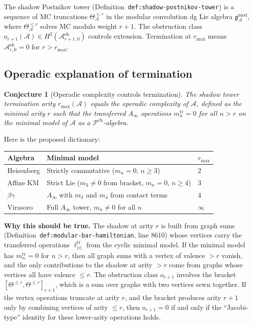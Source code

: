 \documentclass[11pt]{article}
\newtheorem{conjecture}{Conjecture}
\theoremstyle{definition}
\theoremstyle{remark}
\newcommand{\Pch}{\mathcal{P}^{\mathrm{ch}}}
\newcommand{\cA}{\mathcal{A}}
\begin{document}
The shadow Postnikov tower
(Definition~\texttt{def:shadow-postnikov-tower}) is a sequence of
MC truncations $\Theta_\cA^{\leq r}$ in the modular convolution
dg Lie algebra $\mathfrak{g}_\cA^{\mathrm{mod}}$, where
$\Theta_\cA^{\leq r}$ solves MC modulo weight $r+1$.  The
obstruction class $o_{r+1}(\cA) \in H^2(\cA^{\mathrm{sh}}_{r+1,0})$
controls extension.  Termination at $r_{\max}$ means
$\cA^{\mathrm{sh}}_{r,0} = 0$ for $r > r_{\max}$.

\subsection{Operadic explanation of termination}

\begin{conjecture}[Operadic complexity controls termination]
\label{conj:operadic-termination}
The shadow tower termination arity $r_{\max}(\cA)$ equals the
\emph{operadic complexity} of $\cA$, defined as the minimal arity
$r$ such that the transferred $A_\infty$ operations
$m_n^{\mathrm{tr}} = 0$ for all $n > r$ on the minimal model of
$\cA$ as a $\Pch$-algebra.
\end{conjecture}

Here is the proposed dictionary:

\begin{center}
\begin{tabular}{lll}
\hline
\textbf{Algebra} & \textbf{Minimal model} & $r_{\max}$ \\
\hline
Heisenberg & Strictly commutative ($m_n = 0$, $n \geq 3$) & $2$ \\
Affine KM & Strict Lie ($m_3 \neq 0$ from bracket, $m_n = 0$,
$n \geq 4$) & $3$ \\
$\beta\gamma$ & $A_\infty$ with $m_3$ and $m_4$ from contact
terms & $4$ \\
Virasoro & Full $A_\infty$ tower, $m_n \neq 0$ for all $n$ & $\infty$ \\
\hline
\end{tabular}
\end{center}

\textbf{Why this should be true.}  The shadow at arity $r$ is built
from graph sums (Definition~\texttt{def:modular-bar-hamiltonian},
line 8610) whose vertices carry the transferred operations
$\ell_{|v|}^{\mathrm{tr}}$ from the cyclic minimal model.  If the
minimal model has $m_n^{\mathrm{tr}} = 0$ for $n > r$, then all
graph sums with a vertex of valence $> r$ vanish, and the only
contributions to the shadow at arity $> r$ come from graphs whose
vertices all have valence $\leq r$.  The obstruction class
$o_{r+1}$ involves the bracket
$[\Theta^{\leq r}, \Theta^{\leq r}]_{r+1}$, which is a sum over
graphs with two vertices sewn together.  If the vertex operations
truncate at arity $r$, and the bracket produces arity $r+1$ only
by combining vertices of arity $\leq r$, then $o_{r+1} = 0$ if and
only if the ``Jacobi-type'' identity for these lower-arity
operations holds.
\end{document}

